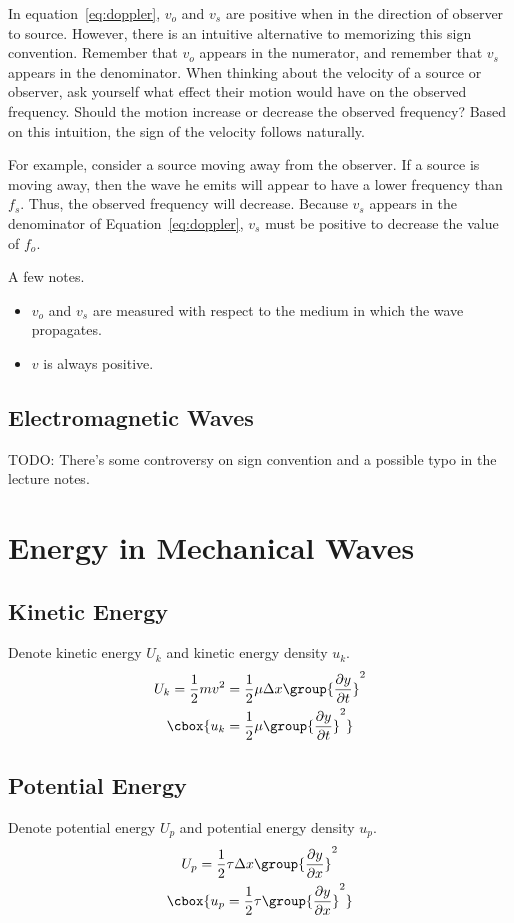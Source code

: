 \documentclass{hw}
\numberwithin{equation}{section}
\begin{document}
In equation~\eqref{eq:doppler}, $v_o$ and $v_s$ are positive when in the
direction of observer to source. However, there is an intuitive alternative to
memorizing this sign convention. Remember that $v_o$ appears in the numerator,
and remember that $v_s$ appears in the denominator. When thinking about the
velocity of a source or observer, ask yourself what effect their motion would
have on the observed frequency. Should the motion increase or decrease the
observed frequency? Based on this intuition, the sign of the velocity follows
naturally.

For example, consider a source moving away from the observer. If a source is
moving away, then the wave he emits will appear to have a lower frequency than
$f_s$. Thus, the observed frequency will decrease. Because $v_s$ appears in the
denominator of Equation~\eqref{eq:doppler}, $v_s$ must be positive to decrease
the value of $f_o$.

A few notes.
\begin{itemize}
  \item $v_o$ and $v_s$ are measured with respect to the medium in which the
    wave propagates.
  \item $v$ is always positive.
\end{itemize}

\subsection{Electromagnetic Waves}
TODO: There's some controversy on sign convention and a possible typo in the
lecture notes.

\section{Energy in Mechanical Waves}
\subsection{Kinetic Energy}
Denote kinetic energy $U_k$ and kinetic energy density $u_k$.
\begin{gather}
  U_k = \frac{1}{2} m v^2 
      = \frac{1}{2} \mu \Delta x \group{\frac{\partial y}{\partial t}}^2 \\
  \cbox{%
  u_k = \frac{1}{2} \mu \group{\frac{\partial y}{\partial t}}^2
  }
\end{gather}

\subsection{Potential Energy}
Denote potential energy $U_p$ and potential energy density $u_p$.
\begin{gather}
  U_p = \frac{1}{2} \tau \Delta x \group{\frac{\partial y}{\partial x}}^2 \\
  \cbox{%
  u_p = \frac{1}{2} \tau \group{\frac{\partial y}{\partial x}}^2
  }
\end{gather}
\end{document}
